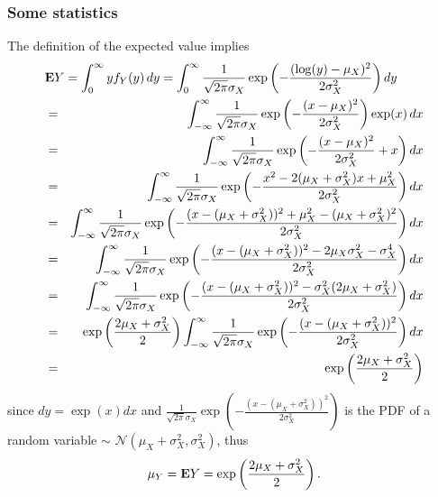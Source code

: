 \subsubsection{Some statistics}

The definition of the expected value implies
\begin{eqnarray*}
\lefteqn{
\Expect Y = \int_{0}^{\infty} y f_Y(y) \, dy
= \int_{0}^{\infty} \frac{1}{\sqrt{2\pi} \sigma_X }  \exp\left(-\frac{(\log(y)-\mu_X)^2}{2\sigma_X^2}\right) dy
}
\\
&=&
\int_{-\infty}^{\infty} \frac{1}{\sqrt{2\pi} \sigma_X }  \exp\left(-\frac{(x-\mu_X)^2}{2\sigma_X^2}\right) \exp(x) \, dx
\\
&=&
\int_{-\infty}^{\infty} \frac{1}{\sqrt{2\pi} \sigma_X }  \exp\left(-\frac{(x-\mu_X)^2}{2\sigma_X^2}+x\right) dx
\\
&=&
\int_{-\infty}^{\infty} \frac{1}{\sqrt{2\pi} \sigma_X }  \exp\left(-\frac{x^2 - 2(\mu_X +\sigma_X^2)x + \mu_X^2}{2\sigma_X^2}\right) dx
\\
&=&
\int_{-\infty}^{\infty} \frac{1}{\sqrt{2\pi} \sigma_X }  \exp\left(-\frac{(x - (\mu_X +\sigma_X^2))^2 + \mu_X^2 -(\mu_X+\sigma_X^2)^2}{2\sigma_X^2}\right) dx
\\
&=&
\int_{-\infty}^{\infty} \frac{1}{\sqrt{2\pi} \sigma_X }  \exp\left(-\frac{(x - (\mu_X +\sigma_X^2))^2 - 2\mu_X\sigma_X^2 - \sigma_X^4}{2\sigma_X^2}\right) dx
\\
&=&
\int_{-\infty}^{\infty} \frac{1}{\sqrt{2\pi} \sigma_X }  \exp\left(-\frac{(x - (\mu_X +\sigma_X^2))^2 - \sigma_X^2(2\mu_X+ \sigma_X^2)}{2\sigma_X^2}\right) dx
\\
&=&
\exp\left(\frac{2\mu_X+ \sigma_X^2}{2}\right)
\int_{-\infty}^{\infty} \frac{1}{\sqrt{2\pi} \sigma_X }  \exp\left(-\frac{(x - (\mu_X +\sigma_X^2))^2 }{2\sigma_X^2}\right) dx
\\
&=&
\exp\left(\frac{2\mu_X+ \sigma_X^2}{2}\right)
\end{eqnarray*}
since $dy = \exp(x) dx$
and $\frac{1}{\sqrt{2\pi} \sigma_X }  \exp\left(-\frac{(x - (\mu_X +\sigma_X^2))^2 }{2\sigma_X^2}\right)$
is the PDF of a random variable $\sim$ $\mathcal{N}(\mu_X+\sigma_X^2,\sigma_X^2)$,
thus
\begin{equation}
\label{eq:log-normal-mean}
\mu_Y
= {\bf E{}} Y = \exp\left(\frac{2\mu_X+ \sigma_X^2}{2}\right).
\end{equation}

